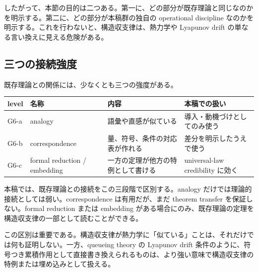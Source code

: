 \documentclass[12pt,a4paper]{article}
\begin{document}
したがって、本節の目的は二つある。第一に、どの部分が既存理論と同じなのかを明示する。第二に、どの部分が本稿群の独自の operational discipline なのかを明示する。これを行わないと、構造収支律は、熱力学や Lyapunov drift の単なる言い換えに見える危険がある。

\subsection{三つの接続強度}\label{ux4e09ux3064ux306eux63a5ux7d9aux5f37ux5ea6}

既存理論との関係には、少なくとも三つの強度がある。

{\def\LTcaptype{table} %
\begin{longtable}[]{@{}
  >{\raggedright\arraybackslash}p{}
  >{\raggedright\arraybackslash}p{}
  >{\raggedright\arraybackslash}p{}
  >{\raggedright\arraybackslash}p{}@{}}
\toprule\noalign{}
\begin{minipage}[b]{\linewidth}\raggedright
level
\end{minipage} & \begin{minipage}[b]{\linewidth}\raggedright
名称
\end{minipage} & \begin{minipage}[b]{\linewidth}\raggedright
内容
\end{minipage} & \begin{minipage}[b]{\linewidth}\raggedright
本稿での扱い
\end{minipage} \\
\midrule\noalign{}
\endhead
\bottomrule\noalign{}
\endlastfoot
G6-a & analogy & 語彙や直感が似ている & 導入・動機づけとしてのみ使う \\
G6-b & correspondence & 量、符号、条件の対応表が作れる & 差分を明示したうえで使う \\
G6-c & formal reduction / embedding & 一方の定理が他方の特例として書ける & universal-law credibility に効く \\
\end{longtable}
}

本稿では、既存理論との接続をこの三段階で区別する。analogy だけでは理論的接続としては弱い。correspondence は有用だが、まだ theorem transfer を保証しない。formal reduction または embedding がある場合にのみ、既存理論の定理を構造収支律の一部として読むことができる。

この区別は重要である。構造収支律が熱力学に「似ている」ことは、それだけでは何も証明しない。一方、queueing theory の Lyapunov drift 条件のように、符号つき累積作用として直接書き換えられるものは、より強い意味で構造収支律の特例または埋め込みとして扱える。
\end{document}
